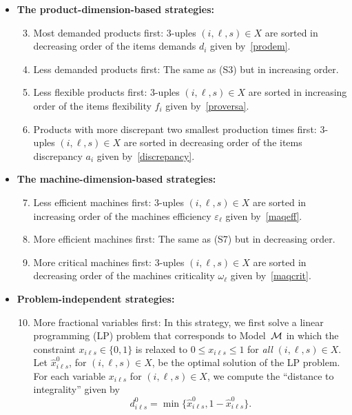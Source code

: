 \documentclass[11pt]{article}
\begin{document}
\begin{itemize}
\item \textbf{The product-dimension-based strategies:}
    \begin{enumerate}[label=(S{{\arabic*}})]
    \setcounter{enumi}{2}
    \item Most demanded products first: 3-uples $(i, \ell, s) \in X$ are sorted in decreasing order of the items demands $d_i$ given by~\eqref{prodem}.
    \item Less demanded products first: The same as (S3) but in increasing order.
    \item Less flexible products first: 3-uples $(i, \ell, s) \in X$ are sorted in increasing order of the items flexibility $f_i$ given by~\eqref{proversa}.
    \item Products with more discrepant two smallest production times first: 3-uples $(i, \ell, s) \in X$ are sorted in decreasing order of the items discrepancy $a_i$ given by~\eqref{discrepancy}.
    \end{enumerate}
\item \textbf{The machine-dimension-based strategies:} 
    \begin{enumerate}[label=(S{{\arabic*}})]
    \setcounter{enumi}{6}
    \item Less efficient machines first: 3-uples $(i, \ell, s) \in X$ are sorted in increasing order of the machines efficiency $\varepsilon_{\ell}$ given by~\eqref{maqeff}.
    \item More efficient machines first: The same as (S7) but in decreasing order.
    \item More critical machines first: 3-uples $(i, \ell, s) \in X$ are sorted in decreasing order of the machines criticality $\omega_\ell$ given by~\eqref{maqcrit}.
    \end{enumerate}
\item \textbf{Problem-independent strategies:} 
    \begin{enumerate}[label=(S{{\arabic*}})]
    \setcounter{enumi}{9}
    \item More fractional variables first: In this strategy, we first solve a linear programming (LP) problem that corresponds to Model~${\cal M}$ in which the constraint $x_{i \ell s} \in \{0,1\}$ is relaxed to $0 \leq x_{i \ell s} \leq 1$ for \textit{all} $(i,\ell,s) \in X$. Let $\hat x_{i \ell s}^0$, for $(i,\ell,s) \in X$, be the optimal solution of the LP problem. For each variable $x_{i \ell s}$ for $(i,\ell,s) \in X$, we compute the ``distance to integrality'' given by
    \[
    d_{i \ell s}^0 = \min\{ \hat x_{i \ell s}^0, 1 - \hat x_{i \ell s}^0\}.
\]
\end{enumerate}
\end{itemize}
\end{document}
